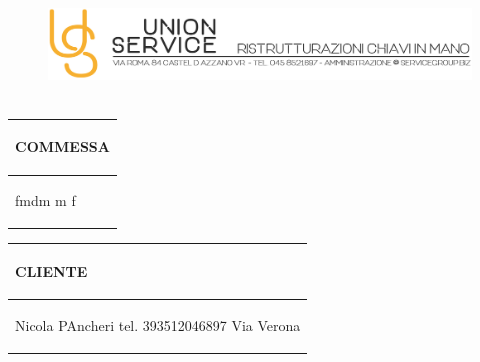 \documentclass[a4paper]{article}
\begin{document}
                        
                        \begin{figure}[!t]
                        \includegraphics[width=15.8cm, height=3cm]{intestazioneAlta2.jpg}
                        \end{figure}
                        
                        \noindent\begin{tabular}{| L{72.2mm} |}
                            \hline
                            \vspace{2.5mm}
                            \begin{spacing}{0}
                            \textbf{COMMESSA}
                            \end{spacing}\\
                            \hline
                            \vspace{4mm}
                            \begin{spacing}{1.2}

                        fmdm \newline m \newline f
                          \end{spacing}\\
                            \hline
                          \end{tabular}
                          \quad
                          \begin{tabular}{ | R{72.2mm} | }
                            \hline
                            \vspace{2.5mm}
                            \begin{spacing}{0}
                            \textbf{CLIENTE}
                            \end{spacing}\\
                            \hline
                            \vspace{4mm}
                            \begin{spacing}{1.2}
                        
                       Nicola PAncheri \newline tel. 393512046897 \newline Via Verona
                          \end{spacing}\\
                            \hline
                          \end{tabular}
                        
\end{document}
